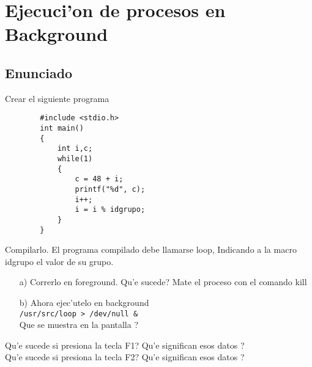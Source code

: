 \section{Ejecuci'on de procesos en Background}
\subsection{Enunciado}
\noindent Crear el siguiente programa
	\begin{verbatim}
		#include <stdio.h>
		int main()
		{
			int i,c;
			while(1)
			{
				c = 48 + i;
				printf("%d", c);
				i++;
				i = i % idgrupo;
			}
		}
	\end{verbatim}
Compilarlo. El programa compilado debe llamarse loop, Indicando a la macro idgrupo el valor
de su grupo.
\begin{itemize}
\item[a)] Correrlo en foreground. Qu'e sucede? Mate el proceso con el comando kill
\item[b)] Ahora ejec'utelo en background\\
            \verb|/usr/src/loop > /dev/null &|\\
            Que se muestra en la pantalla ?
\end{itemize}
Qu'e sucede si presiona la tecla F1? Qu'e significan esos datos ?\\
Qu'e sucede si presiona la tecla F2? Qu'e significan esos datos ?


